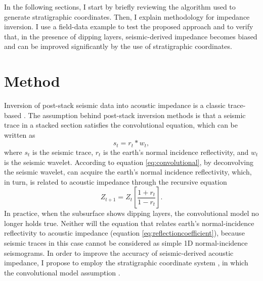 In the following sections, I start by briefly reviewing the algorithm used to generate stratigraphic coordinates. Then, I explain  methodology for impedance inversion. I use a field-data example to test the proposed approach and to verify that, in the presence of dipping layers, seismic-derived impedance becomes biased and can be improved significantly by the use of stratigraphic coordinates. 

\section{Method}
Inversion of post-stack seismic data into acoustic impedance is a classic trace-based  \cite[]{russel1991}. The  assumption behind post-stack inversion methods is that a seismic trace in a stacked section satisfies the convolutional equation, which can be written as 
\begin{equation}
\label{eq:convolutional}
s_t = r_t \ast w_t,
\end{equation}
where $s_t$ is the seismic trace, $r_t$ is the earth's normal incidence reflectivity, and $w_t$ is the seismic wavelet. According to equation \ref{eq:convolutional}, by deconvolving the seismic wavelet,  can acquire the earth's normal incidence reflectivity, which, in turn, is related to acoustic impedance through the recursive equation \cite[]{lindseth1979}
\begin{equation}
\label{eq:reflectioncoefficient}
Z_{t+1} = Z_t \left[\frac{1+r_t}{1-r_t}\right]. 
\end{equation}
In practice, when the subsurface shows dipping layers, the convolutional model no longer holds true. Neither will the equation that relates earth's normal-incidence reflectivity to acoustic impedance (equation \ref{eq:reflectioncoefficient}), because seismic traces in this case cannot be considered as simple 1D normal-incidence seismograms. 
In order to improve the accuracy of seismic-derived acoustic impedance, I propose to employ the stratigraphic coordinate system \cite[]{karimi2011,karimi2014}, in which the convolutional model assumption .


